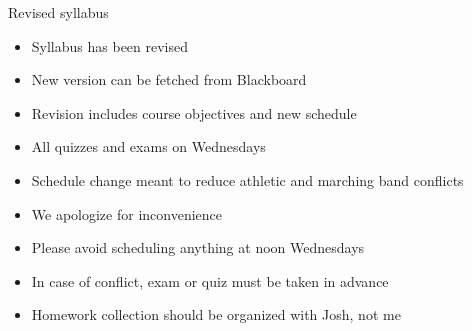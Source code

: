 \documentclass{beamer}
\theoremstyle{definition}
\begin{document}
\begin{frame}{Revised syllabus}
\begin{itemize}
\item Syllabus has been revised
\item New version can be fetched from Blackboard
\item Revision includes course objectives
and \alert{new schedule}
\item All quizzes and exams on \alert{Wednesdays}
\item Schedule change meant to reduce athletic
and marching band conflicts
\item We apologize for inconvenience
\item Please avoid scheduling \alert{anything} at noon Wednesdays
\item In case of conflict, exam or quiz must be taken \alert{in advance}
\item Homework collection should be organized with Josh, not me
\end{itemize}
\end{frame}
\end{document}
